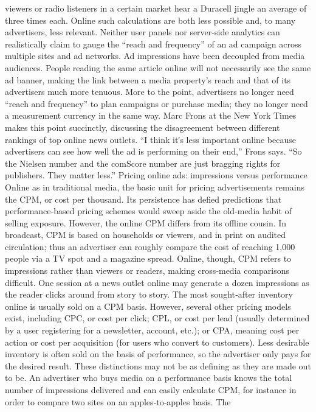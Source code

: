 viewers or radio listeners in a certain market hear a Duracell jingle an
average of three times each.
Online such calculations are both less possible and, to many advertisers,
less relevant. Neither user panels nor server‐side analytics can realistically
claim to gauge the ``reach and frequency'' of an ad campaign across
multiple sites and ad networks. Ad impressions have been decoupled
from media audiences. People reading the same article online will not
necessarily see the same ad banner, making the link between a media
property’s reach and that of its advertisers much more tenuous. More to
the point, advertisers no longer need ``reach and frequency'' to plan
campaigns or purchase media; they no longer need a measurement
currency in the same way.
Marc Frons at the New York Times makes this point succinctly, discussing
the disagreement between different rankings of top online news outlets. ``I
think itʹs less important online because advertisers can see how well the
ad is performing on their end,'' Frons says. ``So the Nielsen number and
the comScore number are just bragging rights for publishers. They matter
less.''
Pricing online ads: impressions versus performance
Online as in traditional media, the basic unit for pricing advertisements
remains the CPM, or cost per thousand. Its persistence has defied
predictions that performance‐based pricing schemes would sweep aside
the old‐media habit of selling exposure.
However, the online CPM differs from its offline cousin. In broadcast,
CPM is based on households or viewers, and in print on audited
circulation; thus an advertiser can roughly compare the cost of reaching
1,000 people via a TV spot and a magazine spread. Online, though, CPM
refers to impressions rather than viewers or readers, making cross‐media
comparisons difficult. One session at a news outlet online may generate a
dozen impressions as the reader clicks around from story to story.
The most sought‐after inventory online is usually sold on a CPM basis.
However, several other pricing models exist, including CPC, or cost
per click; CPL, or cost per lead (usually determined by a user registering
for a newsletter, account, etc.); or CPA, meaning cost per action or cost
per acquisition (for users who convert to customers). Less desirable
inventory is often sold on the basis of performance, so the advertiser only
pays for the desired result.
These distinctions may not be as defining as they are made out to be. An
advertiser who buys media on a performance basis knows the total
number of impressions delivered and can easily calculate CPM, for
instance in order to compare two sites on an apples‐to‐apples basis. The
